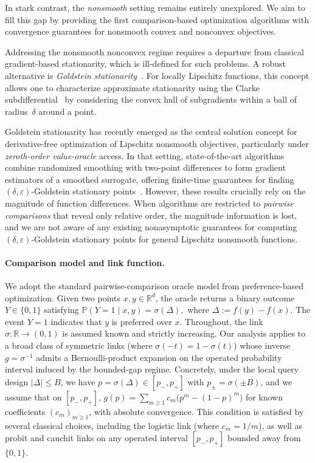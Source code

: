 \documentclass[11pt]{article}
\theoremstyle{plain}
\theoremstyle{remark}
\newcommand{\R}{\mathbb{R}}
\newcommand{\Prob}{\mathbb{P}}
\newcommand{\1}{\mathbf{1}}
\begin{document}
In stark contrast, the \emph{nonsmooth} setting remains entirely unexplored. We aim to fill this gap by providing the first comparison-based optimization algorithms with convergence guarantees for nonsmooth convex and nonconvex objectives.

Addressing the nonsmooth nonconvex regime requires a departure from classical gradient-based stationarity, which is ill-defined for such problems. A robust alternative is \emph{Goldstein stationarity}~\citep{goldstein1977optimization}. For locally Lipschitz functions, this concept allows one to characterize approximate stationarity using the Clarke subdifferential~\citep{clarke1990optimization} by considering the convex hull of subgradients within a ball of radius~$\delta$ around a point.

Goldstein stationarity has recently emerged as the central solution concept for derivative-free optimization of Lipschitz nonsmooth objectives, particularly under \emph{zeroth-order value-oracle} access. In that setting, state-of-the-art algorithms combine randomized smoothing with two-point differences to form gradient estimators of a smoothed surrogate, offering finite-time guarantees for finding $(\delta,\varepsilon)$-Goldstein stationary points~\citep{lin2022gradient,pmlr-v195-jordan23a}. However, these results crucially rely on the magnitude of function differences. When algorithms are restricted to \emph{pairwise comparisons} that reveal only relative order, the magnitude information is lost, and we are not aware of any existing nonasymptotic guarantees for computing $(\delta,\varepsilon)$-Goldstein stationary points for general Lipschitz nonsmooth functions.

\paragraph{Comparison model and link function.}
We adopt the standard pairwise-comparison oracle model from preference-based optimization. Given two points $x, y \in \mathbb{R}^d$, the oracle returns a binary outcome $Y \in \{0,1\}$ satisfying
$
\Prob\left(Y = 1 \mid x, y\right) = \sigma\!\left(\Delta\right),
$
where $\Delta := f(y) - f(x)$. The event $Y = 1$ indicates that $y$ is preferred over $x$. Throughout, the link $\sigma:\R\to(0,1)$ is assumed known and strictly increasing. Our analysis applies to a broad class of symmetric links (where $\sigma(-t)=1-\sigma(t)$) whose inverse $g=\sigma^{-1}$ admits a Bernoulli-product expansion on the operated probability interval induced by the bounded-gap regime. Concretely, under the local query design $|\Delta|\le B$, we have $p=\sigma(\Delta)\in[p_-,p_+]$ with $p_\pm=\sigma(\pm B)$, and we assume that on $[p_-,p_+]$,
$
g(p)=\sum_{m\ge1} c_m\big(p^m-(1-p)^m\big)
$
for known coefficients $(c_m)_{m\ge1}$, with absolute convergence. This condition is satisfied by several classical choices, including the logistic link (where $c_m=1/m$), as well as probit and cauchit links on any operated interval $[p_-,p_+]$ bounded away from $\{0,1\}$.
\end{document}
